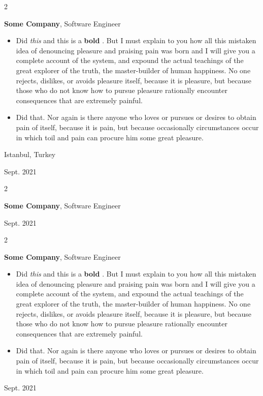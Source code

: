 \documentclass[10pt, letterpaper]{article}
\newenvironment{highlights}{
    \begin{itemize}[
        topsep=0.10 cm,
        parsep=0.10 cm,
        partopsep=0pt,
        itemsep=0pt,
        leftmargin=0.4 cm + 10pt
    ]
}{
    \end{itemize}
} %
\newenvironment{twocolentry}[2][]{
    \onecolentry
    \def\secondColumn{#2}
    \setcolumnwidth{\fill, 4.5 cm}
    \begin{paracol}{2}
}{
    \switchcolumn \raggedleft \secondColumn
    \end{paracol}
    \endonecolentry
} %
\let\hrefWithoutArrow\href
\renewcommand{\href}[2]{\hrefWithoutArrow{#1}{\mbox{\ifthenelse{\equal{#2}{}}{ }{#2 }\raisebox{.15ex}{\footnotesize \faExternalLink*}}}}
\begin{document}
        \begin{twocolentry}{
            Istanbul, Turkey

        Sept. 2021
        }
            \textbf{Some \textnormal{Company}}, Software Engineer
            \begin{highlights}
                \item Did \textit{this} and this is a \textbf{bold} \href{https://example.com}{link}. But I must explain to you how all this mistaken idea of denouncing pleasure and praising pain was born and I will give you a complete account of the system, and expound the actual teachings of the great explorer of the truth, the master-builder of human happiness. No one rejects, dislikes, or avoids pleasure itself, because it is pleasure, but because those who do not know how to pursue pleasure rationally encounter consequences that are extremely painful.
                \item Did that. Nor again is there anyone who loves or pursues or desires to obtain pain of itself, because it is pain, but because occasionally circumstances occur in which toil and pain can procure him some great pleasure.
            \end{highlights}
        \end{twocolentry}


        \vspace{0.2 cm}

        \begin{twocolentry}{
            Sept. 2021
        }
            \textbf{Some \textnormal{Company}}, Software Engineer
        \end{twocolentry}


        \vspace{0.2 cm}

        \begin{twocolentry}{
            Sept. 2021
        }
            \textbf{Some \textnormal{Company}}, Software Engineer
            \begin{highlights}
                \item Did \textit{this} and this is a \textbf{bold} \href{https://example.com}{link}. But I must explain to you how all this mistaken idea of denouncing pleasure and praising pain was born and I will give you a complete account of the system, and expound the actual teachings of the great explorer of the truth, the master-builder of human happiness. No one rejects, dislikes, or avoids pleasure itself, because it is pleasure, but because those who do not know how to pursue pleasure rationally encounter consequences that are extremely painful.
                \item Did that. Nor again is there anyone who loves or pursues or desires to obtain pain of itself, because it is pain, but because occasionally circumstances occur in which toil and pain can procure him some great pleasure.
            \end{highlights}
        \end{twocolentry}
\end{document}

